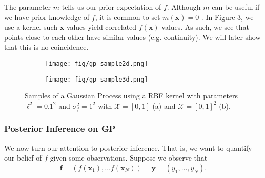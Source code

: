 The parameter $m$ tells us our prior expectation of $f$.
Although $m$ can be useful if we have prior knowledge of $f$, it is common to set $m(\mathbf{x}) = 0$ \cite{murphy2012}.
In Figure \ref{fig:gp-sample}, we use a kernel such $\mathbf{x}$-values yield correlated $f(\mathbf{x})$-values.
As such, we see that points close to each other have similar values (e.g. continuity).
We will later show that this is no coincidence.

\begin{figure}
     \centering
     \begin{subfigure}[b]{0.45\textwidth}
         \centering
         \texttt{[image: fig/gp-sample2d.png]}
         \caption{}
         \label{subfig:2d-gp-sample}
     \end{subfigure}
     \hfill
     \begin{subfigure}[b]{0.45\textwidth}
         \centering
         \texttt{[image: fig/gp-sample3d.png]}
         \caption{}
         \label{subfig:3d-gp-sample}
     \end{subfigure}
     \hfill
    \caption{Samples of a Gaussian Process using a RBF kernel with parameters $\ell^{2} = 0.1^2$ and $\sigma^{2}_f = 1 ^ 2$ with
        $\mathcal{X} = [0, 1]$ (a) and $\mathcal{X} = [0, 1]^2$ (b).
    }
    \label{fig:gp-sample}
\end{figure}

\subsubsection{Posterior Inference on GP}

We now turn our attention to posterior inference.
That is, we want to quantify our belief of $f$ given some observations.
Suppose we observe that 
\begin{equation*}
    \mathbf{f} = (f(\mathbf{x}_1), \ldots f(\mathbf{x}_N)) = \mathbf{y} = (y_1, \ldots, y_N).
\end{equation*}

